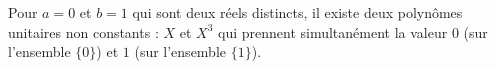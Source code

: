 Pour $a=0$ et $b=1$ qui sont deux réels distincts, il existe deux polynômes unitaires non constants : $X$ et $X^3$ qui prennent simultanément la valeur $0$ (sur l'ensemble $\{0\}$) et $1$ (sur l'ensemble $\{1\}$).
